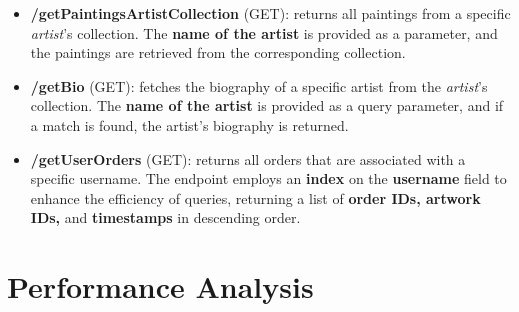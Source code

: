 \documentclass[a4paper,12pt]{article}
\begin{document}
\begin{itemize}
      \item \textbf{/getPaintingsArtistCollection} (GET): returns all paintings from a specific \textit{artist}'s collection. The \textbf{name of the artist} is provided as a parameter, and the paintings are retrieved from the corresponding collection.

      \item \textbf{/getBio} (GET): fetches the biography of a specific artist from the \textit{artist}'s collection. The \textbf{name of the artist} is provided as a query parameter, and if a match is found, the artist's biography is returned.

      \item \textbf{/getUserOrders} (GET): returns all orders that are associated with a specific username. The endpoint employs an \textbf{index} on the \textbf{username} field to enhance the efficiency of queries, returning a list of \textbf{order IDs, artwork IDs,} and \textbf{timestamps} in descending order.

\end{itemize}

\section{Performance Analysis}
\end{document}
